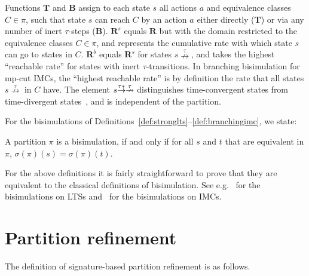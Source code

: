 Functions $\textbf{T}$ and $\textbf{B}$ assign to each state $s$ all actions $a$ and equivalence classes $C\in\pi$, such that state $s$ can reach $C$ by an action $a$ either directly ($\textbf{T}$) or via any number of inert $\tau$-steps ($\textbf{B}$).
$\textbf{R}^s$ equals $\textbf{R}$ but with the domain restricted to the equivalence classes $C\in\pi$, and represents the cumulative rate with which state $s$ can go to states in $C$.
%
%
$\textbf{R}^b$ equals $\textbf{R}^s$ for states $s\!\stackrel{\tau}{\nrightarrow}$, and takes the highest ``reachable rate'' for states with inert $\tau$-transitions.
%
In branching bisimulation for mp-cut IMCs, the ``highest reachable rate'' is by definition the rate that all states ${s\!\overset{\tau}{\nrightarrow}}$ in $C$ have.
%
The element $s\smash{\stackrel{\tau*}{\rightarrow}\stackrel{\tau}{\nrightarrow}}$ distinguishes time-convergent states from time-divergent states~\cite{atr16}, and is independent of the partition.
%
%


For the bisimulations of Definitions~\ref{def:stronglts}--\ref{def:branchingimc}, we state:

\begin{lemma}
\label{lem:parbi}
A partition $\pi$ is a bisimulation, if and only if for all $s$ and $t$ that are equivalent in $\pi$, %
$\sigma(\pi)(s)=\sigma(\pi)(t)$.
\end{lemma}

For the above definitions it is fairly straightforward to prove that they are equivalent to the classical definitions of bisimulation.
See e.g.~\cite{DBLP:journals/entcs/BlomO03,DBLP:conf/atva/WimmerHHSB06} for the bisimulations on LTSs and~\cite{atr16} for the bisimulations on IMCs.







\section{Partition refinement}
The definition of signature-based partition refinement is as follows.

